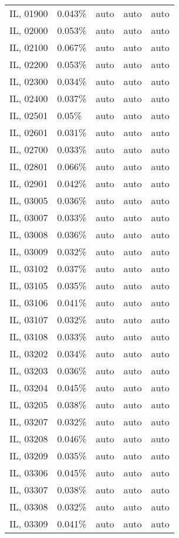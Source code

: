 \begin{longtable}[]{@{}lllll@{}}
IL, 01900 & 0.043\% & auto & auto & auto \\
IL, 02000 & 0.053\% & auto & auto & auto \\
IL, 02100 & 0.067\% & auto & auto & auto \\
IL, 02200 & 0.053\% & auto & auto & auto \\
IL, 02300 & 0.034\% & auto & auto & auto \\
IL, 02400 & 0.037\% & auto & auto & auto \\
IL, 02501 & 0.05\% & auto & auto & auto \\
IL, 02601 & 0.031\% & auto & auto & auto \\
IL, 02700 & 0.033\% & auto & auto & auto \\
IL, 02801 & 0.066\% & auto & auto & auto \\
IL, 02901 & 0.042\% & auto & auto & auto \\
IL, 03005 & 0.036\% & auto & auto & auto \\
IL, 03007 & 0.033\% & auto & auto & auto \\
IL, 03008 & 0.036\% & auto & auto & auto \\
IL, 03009 & 0.032\% & auto & auto & auto \\
IL, 03102 & 0.037\% & auto & auto & auto \\
IL, 03105 & 0.035\% & auto & auto & auto \\
IL, 03106 & 0.041\% & auto & auto & auto \\
IL, 03107 & 0.032\% & auto & auto & auto \\
IL, 03108 & 0.033\% & auto & auto & auto \\
IL, 03202 & 0.034\% & auto & auto & auto \\
IL, 03203 & 0.036\% & auto & auto & auto \\
IL, 03204 & 0.045\% & auto & auto & auto \\
IL, 03205 & 0.038\% & auto & auto & auto \\
IL, 03207 & 0.032\% & auto & auto & auto \\
IL, 03208 & 0.046\% & auto & auto & auto \\
IL, 03209 & 0.035\% & auto & auto & auto \\
IL, 03306 & 0.045\% & auto & auto & auto \\
IL, 03307 & 0.038\% & auto & auto & auto \\
IL, 03308 & 0.032\% & auto & auto & auto \\
IL, 03309 & 0.041\% & auto & auto & auto \\

\end{longtable}
